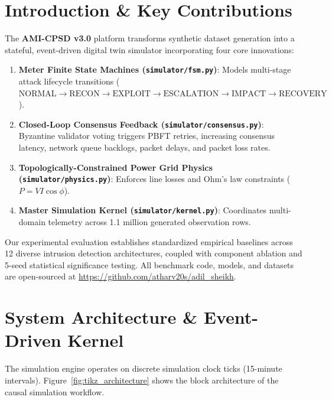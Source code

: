\documentclass[conference]{IEEEtran}
\begin{document}
\section{Introduction \& Key Contributions}
\label{sec:introduction}
The \textbf{AMI-CPSD v3.0} platform transforms synthetic dataset generation into a stateful, event-driven digital twin simulator incorporating four core innovations:
\begin{enumerate}
    \item \textbf{Meter Finite State Machines (\texttt{simulator/fsm.py})}: Models multi-stage attack lifecycle transitions ($\text{NORMAL} \to \text{RECON} \to \text{EXPLOIT} \to \text{ESCALATION} \to \text{IMPACT} \to \text{RECOVERY}$).
    \item \textbf{Closed-Loop Consensus Feedback (\texttt{simulator/consensus.py})}: Byzantine validator voting triggers PBFT retries, increasing consensus latency, network queue backlogs, packet delays, and packet loss rates.
    \item \textbf{Topologically-Constrained Power Grid Physics (\texttt{simulator/physics.py})}: Enforces line losses and Ohm's law constraints ($P = V I \cos\phi$).
    \item \textbf{Master Simulation Kernel (\texttt{simulator/kernel.py})}: Coordinates multi-domain telemetry across 1.1 million generated observation rows.
\end{enumerate}

Our experimental evaluation establishes standardized empirical baselines across 12 diverse intrusion detection architectures, coupled with component ablation and 5-seed statistical significance testing. All benchmark code, models, and datasets are open-sourced at \url{https://github.com/atharv20s/adil_sheikh}.

\section{System Architecture \& Event-Driven Kernel}
\label{sec:architecture}

The simulation engine operates on discrete simulation clock ticks (15-minute intervals). Figure~\ref{fig:tikz_architecture} shows the block architecture of the causal simulation workflow.
\end{document}
